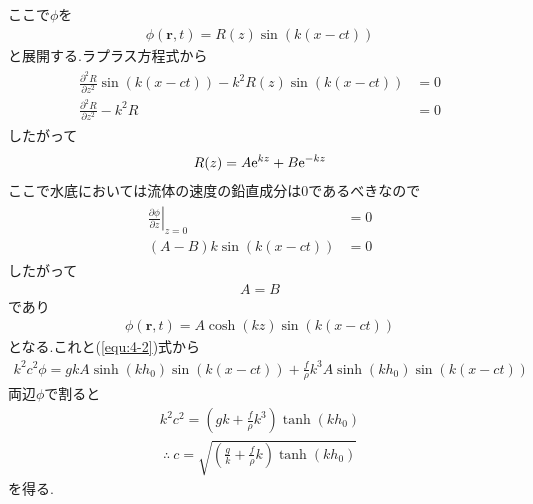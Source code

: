 \documentclass[uplatex,a4j,11pt,dvipdfmx]{jsarticle}
\begin{document}
ここで$\phi$を
\begin{align}
  \phi({\bm r},t)=R(z)\sin(k(x-ct))
\end{align}
と展開する.ラプラス方程式から
\begin{align}
  \begin{split}
    \frac{\partial^2 R}{\partial z^2}\sin(k(x-ct))-k^2R(z)\sin(k(x-ct))&=0\\
    \frac{\partial^2 R}{\partial z^2}-k^2R&=0
  \end{split}
\end{align}
したがって
\begin{align}
  R(z)=A{\rm e}^{kz}+B{\rm e}^{-kz}
\end{align}
ここで水底においては流体の速度の鉛直成分は0であるべきなので
\begin{align}
  \begin{split}
  \left.\frac{\partial\phi}{\partial z}\right|_{z=0}&=0\\
  (A-B)k\sin(k(x-ct))&=0
  \end{split}
\end{align}
したがって
\begin{align}
  A=B
\end{align}
であり
\begin{align}
  \phi({\bm r},t)=A\cosh(kz)\sin(k(x-ct))
\end{align}
となる.これと(\ref{equ:4-2})式から
\begin{align}
  k^2c^2\phi=gkA\sinh(kh_0)\sin(k(x-ct))+\frac{f}{\rho}k^3A\sinh(kh_0)\sin(k(x-ct))
\end{align}
両辺$\phi$で割ると
\begin{align}
  k^2c^2=\left(gk+\frac{f}{\rho}k^3\right)\tanh(kh_0)
\end{align}
\begin{align}
  \therefore\ c=\sqrt{\left(\frac{g}{k}+\frac{f}{\rho}k\right)\tanh(kh_0)}
\end{align}
を得る.
\end{document}
